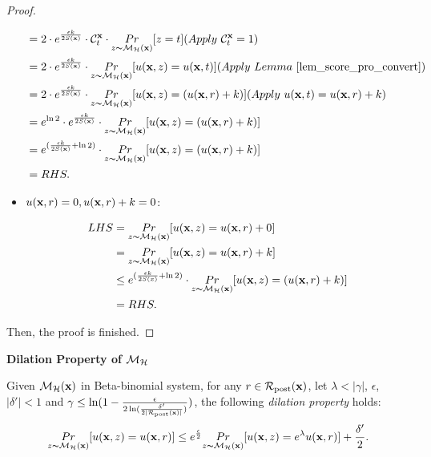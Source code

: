 \documentclass{article}
\begin{document}
\begin{proof}
\begin{itemize}
\begin{equation*}
\begin{split}
      & = 2 \cdot e^{\frac{\epsilon k}{2 S(\dataobs)}} \cdot \cardinality{\dataobs}{t} \cdot \hexpmechPr{\dataobs}{z = t} (Apply\ \cardinality{\dataobs}{t} = 1)\\
      & = 2 \cdot e^{\frac{\epsilon k}{2 S(\dataobs)}} \cdot \hexpmechPr{\dataobs}{\ux{z} = \ux{t}}       (Apply \ Lemma\ \ref{lem_score_pro_convert})\\
      & = 2 \cdot e^{\frac{\epsilon k}{2 S(\dataobs)}} \cdot \hexpmechPr{\dataobs}{\ux{z} = (\ux{r} + k)} (Apply \ \ux{t} = \ux{r} + k)\\
      & = e^{\ln 2} \cdot e^{\frac{\epsilon k}{2 S(\dataobs)}} \cdot \hexpmechPr{\dataobs}{\ux{z} = (\ux{r} + k)}\\
      & = e^{(\frac{\epsilon k}{2 S(\dataobs)} + \ln 2)} \cdot \hexpmechPr{\dataobs}{\ux{z} = (\ux{r} + k)}\\
      & = RHS.
      \end{split}
      \end{equation*} 

  \item {\boldmath $u(\textbf{x}, {r}) = 0, u(\textbf{x}, {r}) + k = 0$}: 

        \begin{equation*}
        \begin{split}
        LHS 
        & = \underset{z \thicksim \mathcal{M}_{\mathcal{H}}(\textbf{x})}{Pr}[u(\textbf{x}, {z}) = u(\textbf{x}, {r}) + 0]\\
        & = \underset{z \thicksim \mathcal{M}_{\mathcal{H}}(\textbf{x})}{Pr}[u(\textbf{x}, {z}) = u(\textbf{x}, {r}) + k]\\
        & \leq e^{(\frac{\epsilon k}{2 S(x)} + \ln 2)} \cdot \underset{z \thicksim \mathcal{M}_{\mathcal{H}}(\textbf{x})}{Pr}[u(\textbf{x}, {z}) = ( u(\textbf{x}, {r}) + k)]\\
        & = RHS.
        \end{split}
        \end{equation*} 

\end{itemize}
Then, the proof is finished.

\end{proof}



\noindent \textbf{Dilation Property of $\mathcal{M}_{\mathcal{H}}$}
\begin{lem}
\label{lem_dilation}
Given $\mathcal{M}_{\mathcal{H}}(\textbf{x})$ in Beta-binomial system, for any $r\in \mathcal{R}_{\textup{post}}(\textbf{x})$, let $\lambda < |\gamma|$, $\epsilon$, $|\delta'| < 1$ and $\gamma \leq \ln(1 - \frac{\epsilon}{2 \ln (\frac{\delta'}{2 |\mathcal{R}_{\textup{post}}(\textbf{x})|})})$, the following \emph{dilation property} holds:
\begin{equation*}
\underset{z \thicksim \mathcal{M}_{\mathcal{H}}(\textbf{x})}{Pr}[u(\textbf{x}, {z}) = u(\textbf{x}, {r})]
\leq
e^{\frac{\epsilon}{2}} \underset{z \thicksim \mathcal{M}_{\mathcal{H}}(\textbf{x})}{Pr}[u(\textbf{x}, {z}) = e^{\lambda} u(\textbf{x}, {r})] + \frac{\delta'}{2}.
\end{equation*}
\end{lem}
\end{document}
